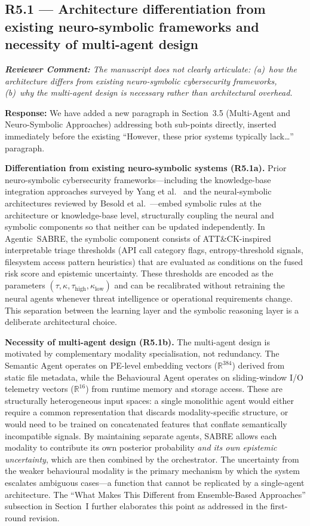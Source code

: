 \documentclass[11pt,a4paper]{article}
\newcommand{\RC}[1]{\begin{reviewbox}\textit{\textbf{Reviewer Comment:} #1}\end{reviewbox}}
\newcommand{\RS}[1]{\noindent\textcolor{responsegreen}{\textbf{Response:}} #1\par\medskip}
\begin{document}
\subsection*{R5.1 --- Architecture differentiation from existing neuro-symbolic frameworks and necessity of multi-agent design}

\RC{The manuscript does not clearly articulate: (a)~how the architecture differs from
existing neuro-symbolic cybersecurity frameworks, (b)~why the multi-agent design is
necessary rather than architectural overhead.}

\RS{We have added a new paragraph in Section~3.5 (Multi-Agent and Neuro-Symbolic
Approaches) addressing both sub-points directly, inserted immediately before the
existing ``However, these prior systems typically lack\ldots'' paragraph.

\textbf{Differentiation from existing neuro-symbolic systems (R5.1a).}
Prior neuro-symbolic cybersecurity frameworks---including the knowledge-base
integration approaches surveyed by Yang et al.~\cite{YangSBK25} and the neural-symbolic
architectures reviewed by Besold et al.~\cite{Besold2021neurosymbolicsurvey}---embed
symbolic rules at the architecture or knowledge-base level, structurally coupling the
neural and symbolic components so that neither can be updated independently. In
Agentic~SABRE, the symbolic component consists of ATT\&CK-inspired interpretable
triage thresholds (API call category flags, entropy-threshold signals, filesystem
access pattern heuristics) that are evaluated as conditions on the fused risk score
and epistemic uncertainty. These thresholds are encoded as the parameters
$(\tau, \kappa, \tau_{\text{high}}, \kappa_{\text{low}})$ and can be recalibrated
without retraining the neural agents whenever threat intelligence or operational
requirements change. This separation between the learning layer and the symbolic
reasoning layer is a deliberate architectural choice.

\textbf{Necessity of multi-agent design (R5.1b).}
The multi-agent design is motivated by complementary modality specialisation, not
redundancy. The Semantic Agent operates on PE-level embedding vectors
($\mathbb{R}^{384}$) derived from static file metadata, while the Behavioural Agent
operates on sliding-window I/O telemetry vectors ($\mathbb{R}^{16}$) from runtime
memory and storage access. These are structurally heterogeneous input spaces: a
single monolithic agent would either require a common representation that discards
modality-specific structure, or would need to be trained on concatenated features
that conflate semantically incompatible signals. By maintaining separate agents,
SABRE allows each modality to contribute its own posterior probability
\emph{and its own epistemic uncertainty}, which are then combined by the
orchestrator. The uncertainty from the weaker behavioural modality is the primary
mechanism by which the system escalates ambiguous cases---a function that cannot
be replicated by a single-agent architecture. The ``What Makes This Different from
Ensemble-Based Approaches'' subsection in Section~I further elaborates this point
as addressed in the first-round revision.}
\end{document}
